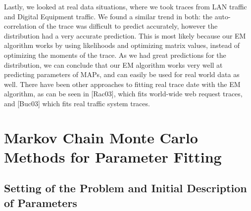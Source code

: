 \documentclass[a4paper,11pt,titlepage]{article}
\begin{document}
Lastly, we looked at real data situations, where we took traces from LAN traffic and Digital Equipment traffic. We found a similar trend in both: the auto-correlation of the trace was difficult to predict accurately, however the distribution had a very accurate prediction. This is most likely because our EM algorithm works by using likelihoods and optimizing matrix values, instead of optimizing the moments of the trace. As we had great predictions for the distribution, we can conclude that our EM algorithm works very well at predicting parameters of MAPs, and can easily be used for real world data as well. There have been other approaches to fitting real trace date with the EM algorithm, as can be seen in [Rac03], which fits world-wide web request traces, and [Buc03] which fits real traffic system traces.

\section{Markov Chain Monte Carlo Methods for Parameter Fitting}

\subsection{Setting of the Problem and Initial Description of Parameters}
\end{document}
